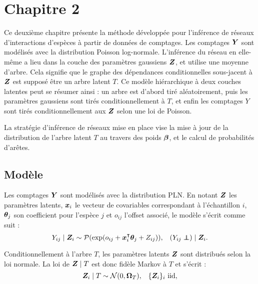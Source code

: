 \section*{Chapitre 2}
Ce deuxième chapitre présente la méthode développée pour l'inférence de réseaux d'interactions d'espèces à partir de données de comptages. Les comptages ${\boldsymbol{Y}}$ sont modélisés avec la distribution Poisson log-normale. L'inférence du réseau en elle-même a lieu dans la couche des paramètres gaussiens ${\boldsymbol{Z}}$, et utilise une moyenne d'arbre. Cela signifie que le graphe des dépendances conditionnelles sous-jacent à ${\boldsymbol{Z}}$ est supposé être un arbre latent $T$. Ce modèle hiérarchique à deux couches latentes peut se résumer ainsi : un arbre est d'abord tiré aléatoirement, puis les paramètres gaussiens sont tirés conditionnellement à $T$, et enfin les comptages $Y$ sont tirés conditionnellement aux ${\boldsymbol{Z}}$ selon une loi de Poisson.

 \begin{center}
   \end{center}
   
   
   La stratégie d'inférence de réseaux mise en place vise la mise à jour de la distribution de l'arbre latent $T$ au travers des poids ${\boldsymbol{\beta}}$, et le calcul de probabilités d'arêtes.

\subsection*{Modèle}
Les comptages ${\boldsymbol{Y}}$ sont modélisés avec la distribution PLN. En notant ${\boldsymbol{Z}}$ les paramètres latents, ${\boldsymbol{x}}_i$ le vecteur de covariables correspondant à l'échantillon $i$, ${\boldsymbol{\theta}}_j$ son coefficient pour l'espèce $j$ et $o_{ij}$ l'offset associé, le modèle s'écrit comme suit :
 $$ Y_{ij}\mid \Zbf_i\sim \Pcal (\exp (o_{ij}+\xb_i^\intercal \thetab_j + Z_{ij})), \;\;\; (Y_{ij} \independent) \mid \Zbf_i .$$
 
Conditionnellement à l'arbre $T$, les paramètres latents ${\boldsymbol{Z}}$ sont distribués selon la loi normale. La loi de ${\boldsymbol{Z}}\mid T$ est donc fidèle Markov à $T$ et s'écrit :
 $${\boldsymbol{Z}}_i\mid T  \sim \mathcal{N} (0, {\boldsymbol{\Omega}}_T), \;\;\;  \{{\boldsymbol{Z}}_i\}_i \text{ iid},$$
 

